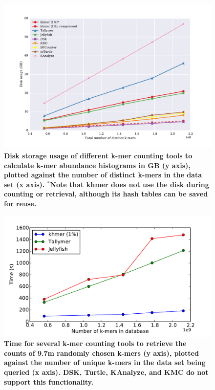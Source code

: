 \documentclass[10pt]{article}
\begin{document}
\begin{figure}[!ht]
\centerline{\includegraphics[width=5in]{./figure/disk_benchmark}}

\caption{\bf Disk storage usage of different k-mer counting tools to
  calculate k-mer abundance histograms in GB (y axis), plotted against
  the number of distinct k-mers in the data set (x axis).  $^*$Note
  that khmer does not use the disk during counting or retrieval,
  although its hash tables can be saved for reuse.}

\label{fig:cmp_disk}
\end{figure}

\begin{figure}[!ht]
\centerline{\includegraphics[width=5in]{./figure/count_benchmark}}
\caption{\bf Time for several k-mer counting tools to retrieve the
  counts of 9.7m randomly chosen k-mers (y axis), plotted against the
  number of unique k-mers in the data set being queried (x axis).
  DSK, Turtle, KAnalyze, and KMC do not support this functionality.}
\label{fig:cmp_count}
\end{figure}
\end{document}

